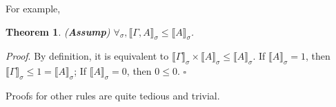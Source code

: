 \documentclass{article}
\newtheorem{theorem}{Theorem}[section]
\newenvironment{proof}{\emph{Proof}.}{\hfill$\square$}
\newcommand{\brs}[1]{\llbracket#1\rrbracket_\sigma}
\begin{document}
For example,

\begin{theorem}
    (\textbf{Assump}) $\forall_\sigma, \brs{\Gamma, A} \leq \brs{A}$.
\end{theorem}

\begin{proof}
    By definition, it is equivalent to $\brs{\Gamma} \times \brs{A} \leq \brs{A}$.
    If $\brs{A} = 1$, then $\brs{\Gamma}\leq 1 = \brs{A}$;
    If $\brs{A} = 0$, then $0\leq 0$.
\end{proof}

Proofs for other rules are quite tedious and trivial.









\end{document}
